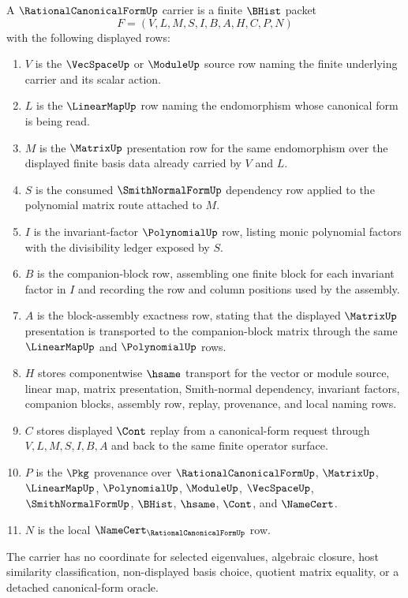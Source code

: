 \begin{definition}
\label{def:rational-canonical-form-carrier}
A $\RationalCanonicalFormUp$ carrier is a finite $\BHist$ packet
$$
F=(V,L,M,S,I,B,A,H,C,P,N)
$$
with the following displayed rows:
\begin{enumerate}
\item $V$ is the $\VecSpaceUp$ or $\ModuleUp$ source row naming the finite underlying carrier and its scalar action.
\item $L$ is the $\LinearMapUp$ row naming the endomorphism whose canonical form is being read.
\item $M$ is the $\MatrixUp$ presentation row for the same endomorphism over the displayed finite basis data already carried by $V$ and $L$.
\item $S$ is the consumed $\SmithNormalFormUp$ dependency row applied to the polynomial matrix route attached to $M$.
\item $I$ is the invariant-factor $\PolynomialUp$ row, listing monic polynomial factors with the divisibility ledger exposed by $S$.
\item $B$ is the companion-block row, assembling one finite block for each invariant factor in $I$ and recording the row and column positions used by the assembly.
\item $A$ is the block-assembly exactness row, stating that the displayed $\MatrixUp$ presentation is transported to the companion-block matrix through the same $\LinearMapUp$ and $\PolynomialUp$ rows.
\item $H$ stores componentwise $\hsame$ transport for the vector or module source, linear map, matrix presentation, Smith-normal dependency, invariant factors, companion blocks, assembly row, replay, provenance, and local naming rows.
\item $C$ stores displayed $\Cont$ replay from a canonical-form request through $V,L,M,S,I,B,A$ and back to the same finite operator surface.
\item $P$ is the $\Pkg$ provenance over $\RationalCanonicalFormUp$, $\MatrixUp$, $\LinearMapUp$, $\PolynomialUp$, $\ModuleUp$, $\VecSpaceUp$, $\SmithNormalFormUp$, $\BHist$, $\hsame$, $\Cont$, and $\NameCert$.
\item $N$ is the local $\NameCert_{\RationalCanonicalFormUp}$ row.
\end{enumerate}
The carrier has no coordinate for selected eigenvalues, algebraic closure, host similarity classification, non-displayed basis choice, quotient matrix equality, or a detached canonical-form oracle.
\end{definition}

